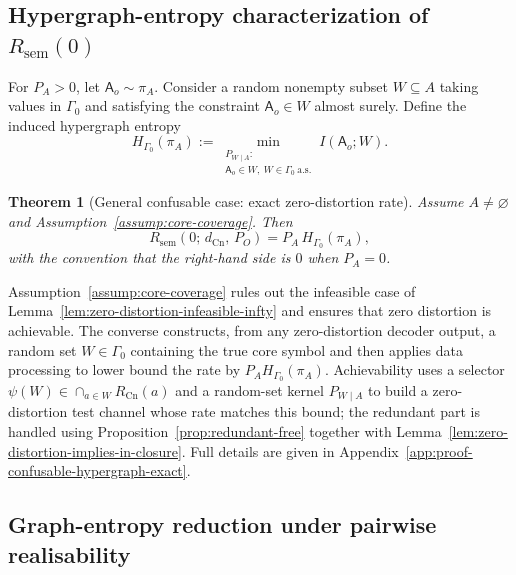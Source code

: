 \documentclass[journal,onecolumn]{IEEEtran}
\makeatletter
\newcommand{\Cn}{\text{Cn}}
\newtheorem{theorem}{Theorem}[section]
\numberwithin{equation}{section}
\renewenvironment{proof}[1][\proofname]{\par
  \pushQED{\qed}%
  \normalfont \topsep6\p@\@plus6\p@\relax
  \trivlist
  \item[\hskip\labelsep
        \itshape
    #1\@addpunct{.}]\ignorespaces
}{%
  \popQED\endtrivlist\@endpefalse
}
\makeatother
\begin{document}
\subsection{Hypergraph-entropy characterization of \(R_{\mathrm{sem}}(0)\)}
\label{subsec:confusable-exact}

For \(P_A>0\), let \(\mathsf{A}_o\sim \pi_A\). Consider a random nonempty subset
\(W\subseteq A\) taking values in \(\Gamma_0\) and satisfying the constraint
\(\mathsf{A}_o\in W\) almost surely. Define the induced hypergraph entropy
\begin{equation}\label{eq:hypergraph-entropy-Gamma0}
  H_{\Gamma_0}(\pi_A)
  :=
  \min_{\substack{P_{W\mid A}:\\
  \mathsf{A}_o\in W,\ W\in\Gamma_0\ \text{a.s.}}}
  I(\mathsf{A}_o;W).
\end{equation}

\begin{theorem}[General confusable case: exact zero-distortion rate]
\label{thm:confusable-hypergraph-exact}
Assume \(A\neq\varnothing\) and Assumption~\ref{assump:core-coverage}.
Then
\begin{equation}\label{eq:R0-hypergraph}
  R_{\mathrm{sem}}(0;\,d_{\Cn},\,P_O)
  =
  P_A\,H_{\Gamma_0}(\pi_A),
\end{equation}
with the convention that the right-hand side is \(0\) when \(P_A=0\).
\end{theorem}

\begin{proof}[Proof sketch]
Assumption~\ref{assump:core-coverage} rules out the infeasible case of
Lemma~\ref{lem:zero-distortion-infeasible-infty} and ensures that zero distortion is achievable.
The converse constructs, from any zero-distortion decoder output, a random set \(W\in\Gamma_0\)
containing the true core symbol and then applies data processing to lower bound the rate by
\(P_A H_{\Gamma_0}(\pi_A)\).
Achievability uses a selector \(\psi(W)\in\cap_{a\in W}R_{\Cn}(a)\) and a random-set kernel
\(P_{W\mid A}\) to build a zero-distortion test channel whose rate matches this bound; the
redundant part is handled using Proposition~\ref{prop:redundant-free} together with
Lemma~\ref{lem:zero-distortion-implies-in-closure}.
Full details are given in Appendix~\ref{app:proof-confusable-hypergraph-exact}.
\end{proof}

\subsection{Graph-entropy reduction under pairwise realisability}
\label{subsec:confusable-graph}
\end{document}
